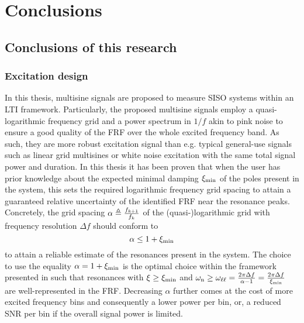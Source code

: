 \chapter{Conclusions}

\section{Conclusions of this research}

  \subsection{Excitation design}
  In this thesis, multisine signals are proposed to measure \gls{SISO} systems within an \gls{LTI} framework.
  Particularly, the proposed multisine signals employ a quasi-logarithmic frequency grid and a power spectrum in $1/f$ akin to pink noise to ensure a good quality of the \gls{FRF} over the whole excited frequency band.
  As such, they are more robust excitation signal than e.g. typical general-use signals such as linear grid multisines or white noise excitation with the same total signal power and duration.
  In this thesis it has been proven that when the user has prior knowledge about the expected minimal damping $\damping[\min]$ of the poles present in the system, this sets the required logarithmic frequency grid spacing to attain a guaranteed relative uncertainty of the identified \gls{FRF} near the resonance peaks.
  Concretely, the grid spacing $\alpha \isdef \frac{f_{k+1}}{f_k}$ of the (quasi-)logarithmic grid with frequency resolution $\Delta f$ should conform to
  \begin{equation}
    \alpha \leq 1 + \damping[\min]
  \end{equation}
  to attain a reliable estimate of the resonances present in the system.
  The choice to use the equality $\alpha = 1+ \damping[\min]$ is the optimal choice within the framework presented in  such that resonances with $\damping \geq \damping[\min]$ and $\wn \geq \omegaLinLog = \frac{2 \pi \Delta f}{\alpha-1} = \frac{2 \pi \Delta f}{\damping[\min]}$ are well-represented in the \gls{FRF}.
  Decreasing $ \alpha$ further comes at the cost of more excited frequency bins and consequently a lower power per bin, or, a reduced \gls{SNR} per bin if the overall signal power is limited.

